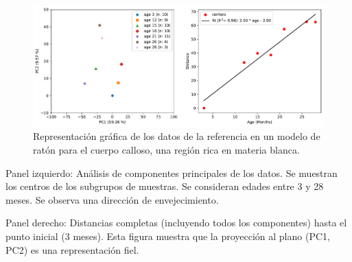 \chapter{}
\label{apx:apx1}

\begin{figure}[!htb]
	\centering
	\includegraphics[width=\linewidth]{figures/suppl_fig_1}
	\caption{Representación gráfica de los datos de la referencia \cite{hahn2023atlas} en un modelo de ratón para el cuerpo calloso, una región rica en materia blanca.}
	\label{fig:suppl1}
\end{figure}

Panel izquierdo: Análisis de componentes principales de los datos. Se muestran los centros de los subgrupos de muestras. Se consideran edades entre 3 y 28 meses. Se observa una dirección de envejecimiento.

Panel derecho: Distancias completas (incluyendo todos los componentes) hasta el punto inicial (3 meses). Esta figura muestra que la proyección al plano (PC1, PC2) es una representación fiel.
